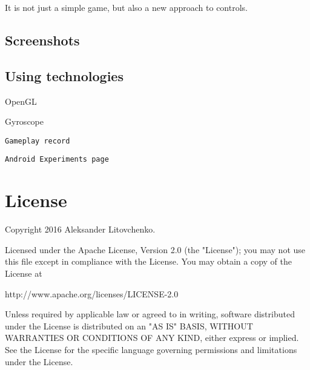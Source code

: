 It is not just a simple game, but also a new approach to controls. \subsection*{Screenshots}

  \subsection*{Using technologies}


\begin{DoxyItemize}
\item Open\+GL
\item Gyroscope
\end{DoxyItemize}

{\tt Gameplay record}

{\tt Android Experiments page}

\section*{License }

\begin{DoxyVerb}Copyright 2016 Aleksander Litovchenko.

Licensed under the Apache License, Version 2.0 (the "License");
you may not use this file except in compliance with the License.
You may obtain a copy of the License at

   http://www.apache.org/licenses/LICENSE-2.0

Unless required by applicable law or agreed to in writing, software
distributed under the License is distributed on an "AS IS" BASIS,
WITHOUT WARRANTIES OR CONDITIONS OF ANY KIND, either express or implied.
See the License for the specific language governing permissions and
limitations under the License.\end{DoxyVerb}
 